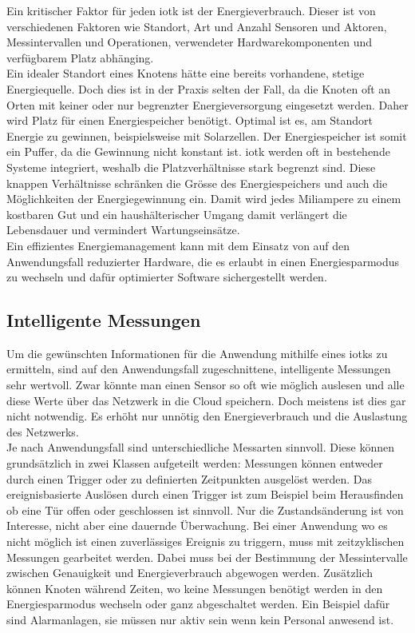 Ein kritischer Faktor für jeden \gls{iotk} ist der Energieverbrauch. Dieser ist von verschiedenen Faktoren wie Standort, Art und Anzahl Sensoren und Aktoren, Messintervallen und Operationen, verwendeter Hardwarekomponenten und verfügbarem Platz abhänging.\\
Ein idealer Standort eines Knotens hätte eine bereits vorhandene, stetige Energiequelle. Doch dies ist in der Praxis selten der Fall, da die Knoten oft an Orten mit keiner oder nur begrenzter Energieversorgung eingesetzt werden. Daher wird Platz für einen Energiespeicher benötigt. Optimal ist es, am Standort Energie zu gewinnen, beispielsweise mit Solarzellen. Der Energiespeicher ist somit ein Puffer, da die Gewinnung nicht konstant ist. \gls{iotk} werden oft in bestehende Systeme integriert, weshalb die Platzverhältnisse stark begrenzt sind. Diese knappen Verhältnisse schränken die Grösse des Energiespeichers und auch die Möglichkeiten der Energiegewinnung ein. Damit wird jedes Miliampere zu einem kostbaren Gut und ein haushälterischer Umgang damit verlängert die Lebensdauer und vermindert Wartungseinsätze.\\
Ein effizientes Energiemanagement kann mit dem Einsatz von auf den Anwendungsfall reduzierter Hardware, die es erlaubt in einen Energiesparmodus zu wechseln und dafür optimierter Software sichergestellt werden.

\subsection{Intelligente Messungen}

Um die gewünschten Informationen für die Anwendung mithilfe eines \glspl{iotk} zu ermitteln, sind auf den Anwendungsfall zugeschnittene, intelligente Messungen sehr wertvoll. Zwar könnte man einen Sensor so oft wie möglich auslesen und alle diese Werte über das Netzwerk in die Cloud speichern. Doch meistens ist dies gar nicht notwendig. Es erhöht nur unnötig den Energieverbrauch und die Auslastung des Netzwerks.\\
Je nach Anwendungsfall sind unterschiedliche Messarten sinnvoll. Diese können grundsätzlich in zwei Klassen aufgeteilt werden: Messungen können entweder durch einen Trigger oder zu definierten Zeitpunkten ausgelöst werden. Das ereignisbasierte Auslösen durch einen Trigger ist zum Beispiel beim Herausfinden ob eine Tür offen oder geschlossen ist sinnvoll. Nur die Zustandsänderung ist von Interesse, nicht aber eine dauernde Überwachung. Bei einer Anwendung wo es nicht möglich ist einen zuverlässiges Ereignis zu triggern, muss mit zeitzyklischen Messungen gearbeitet werden. Dabei muss bei der Bestimmung der Messintervalle zwischen Genauigkeit und Energieverbrauch abgewogen werden. Zusätzlich können Knoten während Zeiten, wo keine Messungen benötigt werden in den Energiesparmodus wechseln oder ganz abgeschaltet werden. Ein Beispiel dafür sind Alarmanlagen, sie müssen nur aktiv sein wenn kein Personal anwesend ist.

